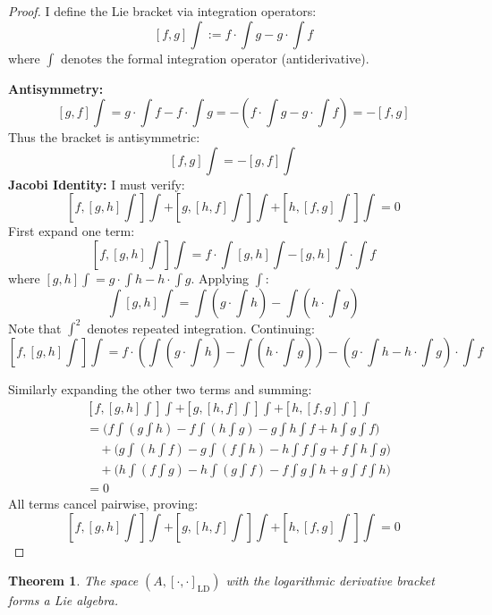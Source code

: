 \documentclass{artjlt}
\newtheorem{thm}{Theorem}
\newcommand{\?}{\textbackslash}
\begin{document}
\begin{proof}
I define the Lie bracket via integration operators:
\[
[f,g]\int := f \cdot \int g - g \cdot \int f 
\]
where $\int $ denotes the formal integration operator (antiderivative).

\noindent\textbf{Antisymmetry:}
\[
[g,f]\int = g \cdot \int f - f \cdot \int g = - (f \cdot \int g - g \cdot \int f) = -[f,g]
\]
Thus the bracket is antisymmetric:
\[
\boxed{[f,g]\int = -[g,f]\int} 
\]
\noindent\textbf{Jacobi Identity:}
I must verify:
\[
[f,[g,h]\int]\int + [g,[h,f]\int]\int + [h,[f,g]\int]\int = 0
\]
First expand one term:
\[
[f,[g,h] \int]\int = f \cdot \int [g,h] \int - [g,h] \int \cdot \int f
\]
where $[g,h]\int = g \cdot \int h - h \cdot \int g$. Applying $\int $:
\[
\int [g,h] \int= \int (g \cdot \int h) - \int (h \cdot \int g)
\]
Note that $\int ^2$ denotes repeated integration. Continuing:
\[
[f,[g,h]\int]\int = f \cdot (\int (g \cdot \int h) - \int (h \cdot \int g)) - (g \cdot \int h - h \cdot \int g) \cdot \int f
\]

Similarly expanding the other two terms and summing:
\[
\begin{aligned}
&[f,[g,h]\int]\int + [g,[h,f]\int]\int + [h,[f,g]\int]\int \\
&= \big(f \int (g \int h) - f \int (h \int g) - g \int h \int f + h \int g \int f\big) \\
&\quad + \big(g \int (h \int f) - g \int (f \int h) - h \int f \int g + f \int h \int g\big) \\
&\quad + \big(h \int (f \int g) - h \int (g \int f) - f \int g \int h + g \int f \int h\big) \\
&= 0
\end{aligned}
\]
All terms cancel pairwise, proving:
\[
\boxed{[f,[g,h]\int]\int + [g,[h,f]\int]\int + [h,[f,g]\int]\int = 0} 
\]


\end{proof}
   
   \begin{thm}
The space $(A, [\cdot,\cdot]_{\text{LD}})$ with the logarithmic derivative bracket forms a Lie algebra.
\end{thm}
\end{document}
